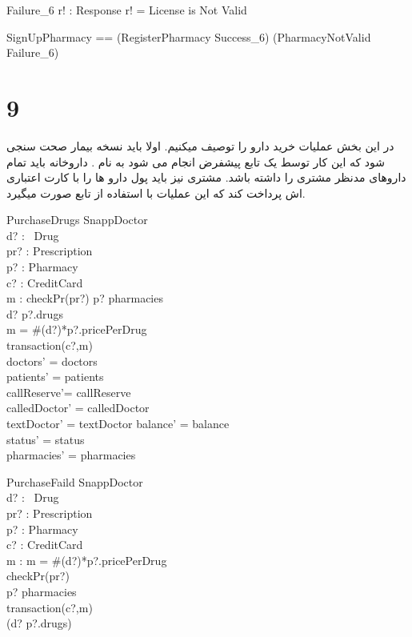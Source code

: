 \documentclass{article}
\begin{document}
\begin{schema}{Failure_6}
r! : Response
\where
r! = License is Not Valid
\end{schema}

\begin{zed}
SignUpPharmacy == (RegisterPharmacy \land Success_6) \lor (PharmacyNotValid \land Failure_6)
\end{zed}

\section*{9}

در این بخش عملیات خرید دارو را توصیف میکنیم. اولا باید نسخه بیمار صحت سنجی شود که این کار توسط یک تابع پیشفرض انجام می شود به نام  . داروخانه باید تمام داروهای مدنظر مشتری را داشته باشد. مشتری نیز باید پول دارو ها را با کارت اعتباری اش پرداخت کند که این عملیات با استفاده از تابع  صورت میگیرد.
\begin{schema}{PurchaseDrugs}
\Delta SnappDoctor\\
d? : \power~Drug\\
pr? : Prescription\\
p? : Pharmacy\\
c? : CreditCard\\
m : \nat
\where
checkPr(pr?)
p? \in pharmacies\\
d? \subseteq p?.drugs\\
m = \#(d?)*p?.pricePerDrug\\
transaction(c?,m)\\
doctors' = doctors\\
patients' = patients\\ 
callReserve'= callReserve\\
calledDoctor' = calledDoctor\\
textDoctor' = textDoctor
balance' = balance\\
status' = status\\
pharmacies' = pharmacies
\end{schema}

\begin{schema}{PurchaseFaild}
\Xi SnappDoctor\\
d? : \power~Drug\\
pr? : Prescription\\
p? : Pharmacy\\
c? : CreditCard\\
m : \nat
\where
m = \#(d?)*p?.pricePerDrug\\
\neg checkPr(pr?) \lor\\
p? \notin pharmacies \lor\\
\neg transaction(c?,m) \lor\\
\neg (d? \subseteq p?.drugs)
\end{schema}
\end{document}
